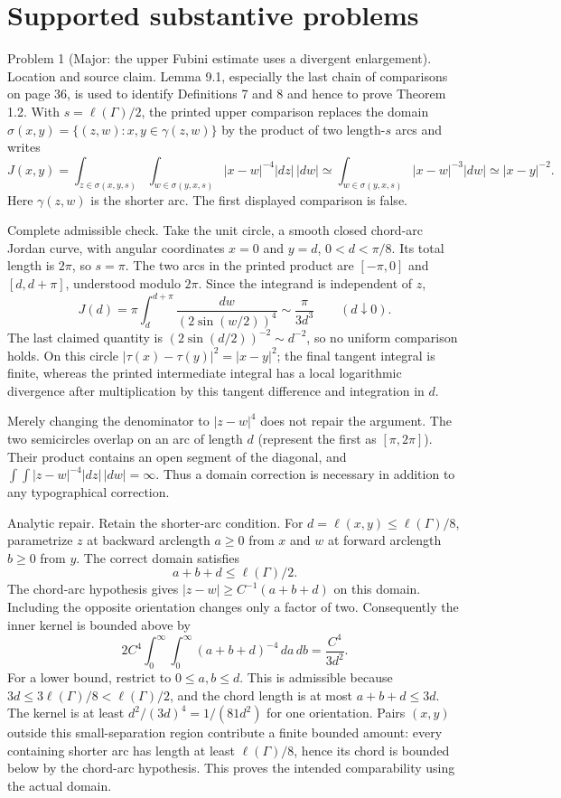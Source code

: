 \documentclass[10pt]{article}
\begin{document}
\section*{Supported substantive problems}
Problem 1 (Major: the upper Fubini estimate uses a divergent enlargement).  Location and source claim. Lemma 9.1, especially the last chain of comparisons on page 36, is used to identify Definitions 7 and 8 and hence to prove Theorem 1.2. With \(s=\ell(\Gamma)/2\), the printed upper comparison replaces the domain \(\sigma(x,y)=\{(z,w):x,y\in\gamma(z,w)\}\) by the product of two length-\(s\) arcs and writes \[J(x,y)=
 \int_{z\in\sigma(x,y,s)}\int_{w\in\sigma(y,x,s)}
       |x-w|^{-4}|dz|\,|dw|
 \simeq
 \int_{w\in\sigma(y,x,s)}|x-w|^{-3}|dw|
 \simeq |x-y|^{-2}.\] Here \(\gamma(z,w)\) is the shorter arc. The first displayed comparison is false.\par
Complete admissible check. Take the unit circle, a smooth closed chord-arc Jordan curve, with angular coordinates \(x=0\) and \(y=d\), \(0<d<\pi/8\). Its total length is \(2\pi\), so \(s=\pi\). The two arcs in the printed product are \([-\pi,0]\) and \([d,d+\pi]\), understood modulo \(2\pi\). Since the integrand is independent of \(z\), \[J(d)=\pi\int_d^{d+\pi}\frac{dw}{(2\sin(w/2))^4}
      \sim \frac{\pi}{3d^3}\qquad(d\downarrow0).\] The last claimed quantity is \((2\sin(d/2))^{-2}\sim d^{-2}\), so no uniform comparison holds. On this circle \(|\tau(x)-\tau(y)|^2=|x-y|^2\); the final tangent integral is finite, whereas the printed intermediate integral has a local logarithmic divergence after multiplication by this tangent difference and integration in \(d\).\par
Merely changing the denominator to \(|z-w|^4\) does not repair the argument. The two semicircles overlap on an arc of length \(d\) (represent the first as \([\pi,2\pi]\)). Their product contains an open segment of the diagonal, and \(\int\int|z-w|^{-4}|dz|\,|dw|=\infty\). Thus a domain correction is necessary in addition to any typographical correction.\par
Analytic repair. Retain the shorter-arc condition. For \(d=\ell(x,y)\leq\ell(\Gamma)/8\), parametrize \(z\) at backward arclength \(a\geq0\) from \(x\) and \(w\) at forward arclength \(b\geq0\) from \(y\). The correct domain satisfies \[a+b+d\leq \ell(\Gamma)/2.\] The chord-arc hypothesis gives \(|z-w|\geq C^{-1}(a+b+d)\) on this domain. Including the opposite orientation changes only a factor of two. Consequently the inner kernel is bounded above by \[2C^4\int_0^\infty\int_0^\infty(a+b+d)^{-4}\,da\,db
 =\frac{C^4}{3d^2}.\] For a lower bound, restrict to \(0\leq a,b\leq d\). This is admissible because \(3d\leq3\ell(\Gamma)/8<\ell(\Gamma)/2\), and the chord length is at most \(a+b+d\leq3d\). The kernel is at least \(d^2/(3d)^4=1/(81d^2)\) for one orientation. Pairs \((x,y)\) outside this small-separation region contribute a finite bounded amount: every containing shorter arc has length at least \(\ell(\Gamma)/8\), hence its chord is bounded below by the chord-arc hypothesis. This proves the intended comparability using the actual domain.\par
\end{document}

